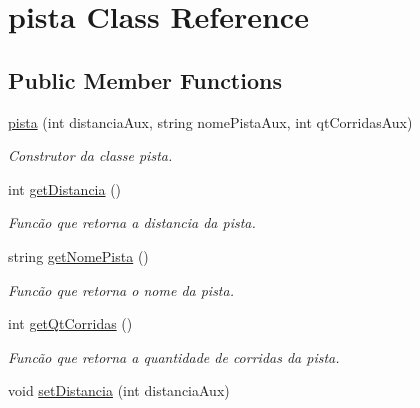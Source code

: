 \hypertarget{classpista}{}\section{pista Class Reference}
\label{classpista}
\subsection*{Public Member Functions}
\begin{DoxyCompactItemize}
\item 
\hyperlink{classpista_a83cb1ad72080cebd300558305f1f8443}{pista} (int distancia\+Aux, string nome\+Pista\+Aux, int qt\+Corridas\+Aux)
\begin{DoxyCompactList}\small\item\em Construtor da classe pista. \end{DoxyCompactList}\item 
int \hyperlink{classpista_a2b432a2333183822a5261d41be63d882}{get\+Distancia} ()\hypertarget{classpista_a2b432a2333183822a5261d41be63d882}{}\label{classpista_a2b432a2333183822a5261d41be63d882}

\begin{DoxyCompactList}\small\item\em Funcão que retorna a distancia da pista. \end{DoxyCompactList}\item 
string \hyperlink{classpista_ab9e72fe3540bd45bf9840d60bd0240b8}{get\+Nome\+Pista} ()\hypertarget{classpista_ab9e72fe3540bd45bf9840d60bd0240b8}{}\label{classpista_ab9e72fe3540bd45bf9840d60bd0240b8}

\begin{DoxyCompactList}\small\item\em Funcão que retorna o nome da pista. \end{DoxyCompactList}\item 
int \hyperlink{classpista_afdc07d7729904281fec1d23a1ec2316e}{get\+Qt\+Corridas} ()\hypertarget{classpista_afdc07d7729904281fec1d23a1ec2316e}{}\label{classpista_afdc07d7729904281fec1d23a1ec2316e}

\begin{DoxyCompactList}\small\item\em Funcão que retorna a quantidade de corridas da pista. \end{DoxyCompactList}\item 
void \hyperlink{classpista_a67010d404d96f1f8b84cccba945db4ff}{set\+Distancia} (int distancia\+Aux)\hypertarget{classpista_a67010d404d96f1f8b84cccba945db4ff}{}\label{classpista_a67010d404d96f1f8b84cccba945db4ff}


\end{DoxyCompactItemize}
